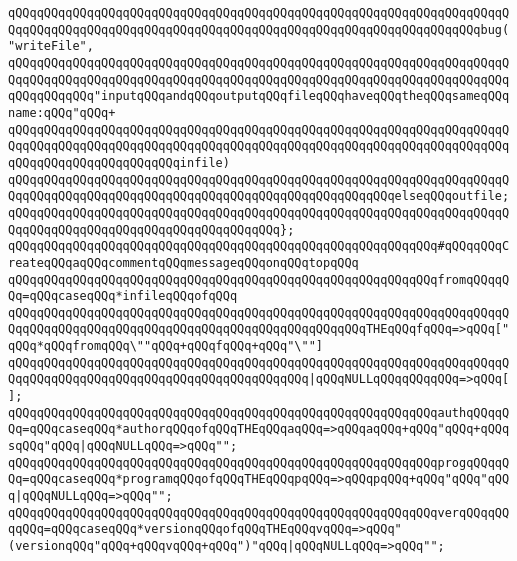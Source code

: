 \verb|qQQqqQQqqQQqqQQqqQQqqQQqqQQqqQQqqQQqqQQqqQQqqQQqqQQqqQQqqQQqqQQqqQQqqQQqqQQqqQQqqQQqqQQqqQQqqQQqqQQqqQQqqQQqqQQqqQQqqQQqqQQqqQQqqQQqqQQqbug("writeFile",|\newline
\verb|qQQqqQQqqQQqqQQqqQQqqQQqqQQqqQQqqQQqqQQqqQQqqQQqqQQqqQQqqQQqqQQqqQQqqQQqqQQqqQQqqQQqqQQqqQQqqQQqqQQqqQQqqQQqqQQqqQQqqQQqqQQqqQQqqQQqqQQqqQQqqQQqqQQqqQQq"inputqQQqandqQQqoutputqQQqfileqQQqhaveqQQqtheqQQqsameqQQqname:qQQq"qQQq+|\newline
\verb|qQQqqQQqqQQqqQQqqQQqqQQqqQQqqQQqqQQqqQQqqQQqqQQqqQQqqQQqqQQqqQQqqQQqqQQqqQQqqQQqqQQqqQQqqQQqqQQqqQQqqQQqqQQqqQQqqQQqqQQqqQQqqQQqqQQqqQQqqQQqqQQqqQQqqQQqqQQqqQQqqQQqinfile)|\newline
\verb|qQQqqQQqqQQqqQQqqQQqqQQqqQQqqQQqqQQqqQQqqQQqqQQqqQQqqQQqqQQqqQQqqQQqqQQqqQQqqQQqqQQqqQQqqQQqqQQqqQQqqQQqqQQqqQQqqQQqqQQqqQQqelseqQQqoutfile;|\newline
\verb|qQQqqQQqqQQqqQQqqQQqqQQqqQQqqQQqqQQqqQQqqQQqqQQqqQQqqQQqqQQqqQQqqQQqqQQqqQQqqQQqqQQqqQQqqQQqqQQqqQQqqQQqqQQq};|\newline
\newline
\verb|qQQqqQQqqQQqqQQqqQQqqQQqqQQqqQQqqQQqqQQqqQQqqQQqqQQqqQQqqQQq#qQQqqQQqCreateqQQqaqQQqcommentqQQqmessageqQQqonqQQqtopqQQq|\newline
\verb|qQQqqQQqqQQqqQQqqQQqqQQqqQQqqQQqqQQqqQQqqQQqqQQqqQQqqQQqqQQqfromqQQqqQQq=qQQqcaseqQQq*infileqQQqofqQQq|\newline
\verb|qQQqqQQqqQQqqQQqqQQqqQQqqQQqqQQqqQQqqQQqqQQqqQQqqQQqqQQqqQQqqQQqqQQqqQQqqQQqqQQqqQQqqQQqqQQqqQQqqQQqqQQqqQQqqQQqqQQqqQQqTHEqQQqfqQQq=>qQQq["qQQq*qQQqfromqQQq\""qQQq+qQQqfqQQq+qQQq"\""]|\newline
\verb|qQQqqQQqqQQqqQQqqQQqqQQqqQQqqQQqqQQqqQQqqQQqqQQqqQQqqQQqqQQqqQQqqQQqqQQqqQQqqQQqqQQqqQQqqQQqqQQqqQQqqQQqqQQqqQQq|\verb#|qQQqNULLqQQqqQQqqQQq=>qQQq[];#\newline
\verb|qQQqqQQqqQQqqQQqqQQqqQQqqQQqqQQqqQQqqQQqqQQqqQQqqQQqqQQqqQQqauthqQQqqQQq=qQQqcaseqQQq*authorqQQqofqQQqTHEqQQqaqQQq=>qQQqaqQQq+qQQq"qQQq+qQQqsqQQq"qQQq|\verb#|qQQqNULLqQQq=>qQQq"";#\newline
\verb|qQQqqQQqqQQqqQQqqQQqqQQqqQQqqQQqqQQqqQQqqQQqqQQqqQQqqQQqqQQqprogqQQqqQQq=qQQqcaseqQQq*programqQQqofqQQqTHEqQQqpqQQq=>qQQqpqQQq+qQQq"qQQq"qQQq|\verb#|qQQqNULLqQQq=>qQQq"";#\newline
\verb|qQQqqQQqqQQqqQQqqQQqqQQqqQQqqQQqqQQqqQQqqQQqqQQqqQQqqQQqqQQqverqQQqqQQqqQQq=qQQqcaseqQQq*versionqQQqofqQQqTHEqQQqvqQQq=>qQQq"(versionqQQq"qQQq+qQQqvqQQq+qQQq")"qQQq|\verb#|qQQqNULLqQQq=>qQQq"";#\newline

